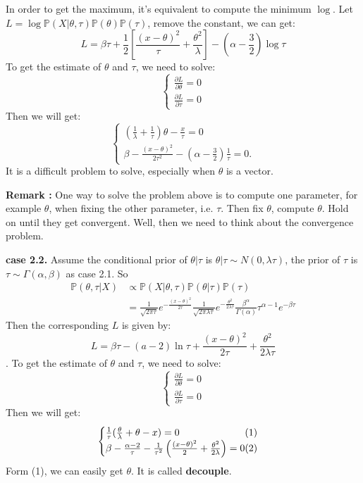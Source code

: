 \documentclass[11pt]{article}
\def\BP{{\bf P}}
\def\BP{{\mathbb P}}
\begin{document}
In order to get the maximum, it's equivalent to compute the minimum $\log$. Let $L = \log \BP(X|\theta, \tau)\BP(\theta)\BP(\tau)$, remove the constant, we can get:
\[ L = \beta\tau + \frac{1}{2}\left[ \frac{(x-\theta)^2}{\tau} + \frac{\theta^2}{\lambda} \right] - (\alpha-\frac{3}{2})\log \tau
\]
To get the estimate of $\theta$ and $\tau$, we need to solve:
\[
\begin{cases}
\frac{\partial L}{\partial \theta} = 0 \\
\frac{\partial L}{\partial \tau} = 0
\end{cases}
\]
Then we will get:
\[\begin{cases}
(\frac{1}{\lambda} + \frac{1}{\tau})\theta - \frac{x}{\tau} = 0 \\
\beta - \frac{(x-\theta)^2}{2\tau^2} - (\alpha - \frac{3}{2})\frac{1}{\tau} = 0.
\end{cases}\]
It is a difficult problem to solve, especially when $\theta$ is a vector.

\textbf{Remark :} One way to solve the problem above is to compute one parameter, for example $\theta$, when fixing the other parameter, i.e. $\tau$. Then fix $\theta$, compute $\theta$. Hold on until they get convergent. Well, then we need to think about the convergence problem.

\textbf{case 2.2.} Assume the conditional prior of $\theta | \tau$ is $\theta | \tau \sim N(0, \lambda\tau)$, the prior of $\tau$ is $\tau \sim \Gamma(\alpha, \beta)$ as case 2.1. So
\[\begin{split}
\BP(\theta, \tau | X) &\propto \BP(X | \theta, \tau) \BP(\theta | \tau) \BP(\tau) \\
&= \frac{1}{\sqrt{2\pi\tau}} e^{-\frac{(x-\theta)^2}{2\tau}}
\frac{1}{\sqrt{2\pi\lambda \tau}} e^{-\frac{\theta^2}{2\lambda\tau}}
\frac{\beta^\alpha}{\Gamma(\alpha)} \tau^{\alpha - 1} e^{-\beta\tau}
\end{split}
\]
Then the corresponding $L$ is given by:
\[ L = \beta\tau - (a-2)\ln \tau + \frac{(x-\theta)^2}{2\tau} + \frac{\theta^2}{2\lambda \tau}
\].
To get the estimate of $\theta$ and $\tau$, we need to solve:
\[\begin{cases}
\frac{\partial L}{\partial \theta} = 0 \\
\frac{\partial L}{\partial \tau} = 0
\end{cases}
\]
Then we will get:
\begin{equation*} \begin{cases}
\frac{1}{\tau}(\frac{\theta}{\lambda} + \theta - x) = 0 \hfill (1) \\
\beta - \frac{\alpha - 2}{\tau} - \frac{1}{\tau^2}\left(\frac{(x-\theta)^2}{2} + \frac{\theta^2}{2\lambda} \right) = 0 \hfill(2)
\end{cases}
\end{equation*}
Form (1), we can easily get $\theta$. It is called \textbf{decouple}.
\end{document}
